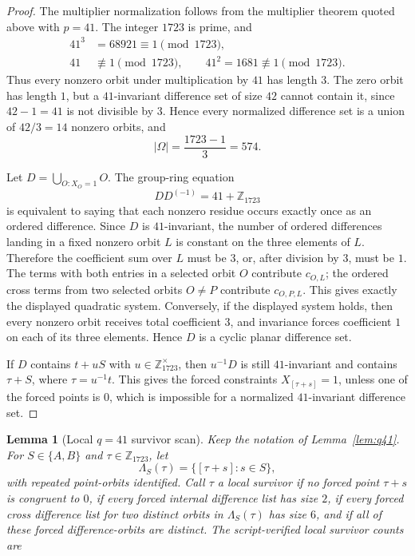 \documentclass[11pt,letterpaper]{amsart}
\theoremstyle{plain}
\newtheorem{lemma}[theorem]{Lemma}
\newcommand{\Z}{\mathbb Z}
\begin{document}
\begin{proof}
The multiplier normalization follows from the multiplier theorem quoted
above with \(p=41\).  The integer \(1723\) is prime, and
\[
\begin{aligned}
 41^3&=68921\equiv1\pmod {1723},\\
 41&\not\equiv1\pmod {1723},\qquad
 41^2=1681\not\equiv1\pmod {1723}.
\end{aligned}
\]
Thus every nonzero orbit under multiplication by \(41\) has length \(3\).
The zero orbit has length \(1\), but a \(41\)-invariant difference set of
size \(42\) cannot contain it, since \(42-1=41\) is not divisible by
\(3\).  Hence every normalized difference set is a union of \(42/3=14\)
nonzero orbits, and
\[
 |\Omega|=\frac{1723-1}{3}=574.
\]

Let \(D=\bigcup_{O:X_O=1}O\).  The group-ring equation
\[
 DD^{(-1)}=41+\Z_{1723}
\]
is equivalent to saying that each nonzero residue occurs exactly once as
an ordered difference.  Since \(D\) is \(41\)-invariant, the number of
ordered differences landing in a fixed nonzero orbit \(L\) is constant
on the three elements of \(L\).  Therefore the coefficient sum over
\(L\) must be \(3\), or, after division by \(3\), must be \(1\).  The
terms with both entries in a selected orbit \(O\) contribute \(c_{O,L}\);
the ordered cross terms from two selected orbits \(O\ne P\) contribute
\(c_{O,P,L}\).  This gives exactly the displayed quadratic system.
Conversely, if the displayed system holds, then every nonzero orbit
receives total coefficient \(3\), and invariance forces coefficient
\(1\) on each of its three elements.  Hence \(D\) is a cyclic planar
difference set.

If \(D\) contains \(t+uS\) with \(u\in\Z_{1723}^\times\), then
\(u^{-1}D\) is still \(41\)-invariant and contains \(\tau+S\), where
\(\tau=u^{-1}t\).  This gives the forced constraints
\(X_{[\tau+s]}=1\), unless one of the forced points is \(0\), which is
impossible for a normalized \(41\)-invariant difference set.

\QFortyOneForcedCores
\end{proof}

\begin{lemma}[Local \(q=41\) survivor scan]
\label{lem:q41-survivors}
Keep the notation of Lemma~\ref{lem:q41}.  For
\(S\in\{A,B\}\) and \(\tau\in\Z_{1723}\), let
\[
 \Lambda_S(\tau)=\{[\tau+s]:s\in S\},
\]
with repeated point-orbits identified.  Call \(\tau\) a local survivor
if no forced point \(\tau+s\) is congruent to \(0\), if every forced
internal difference list has size \(2\), if every forced cross
difference list for two distinct orbits in \(\Lambda_S(\tau)\) has size
\(6\), and if all of these forced difference-orbits are distinct.  The
script-verified local survivor counts are
\QFortyOneSurvivorTable
\end{lemma}
\end{document}
